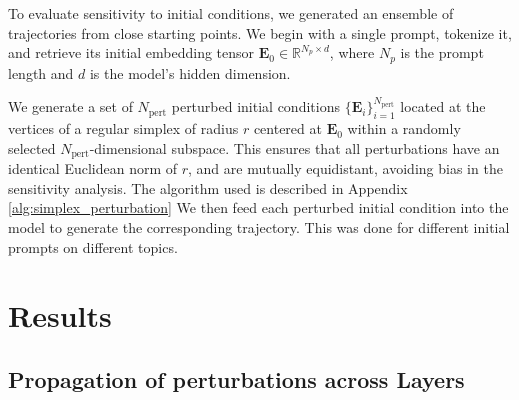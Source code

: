 \documentclass[a4paper,12pt]{article}
\begin{document}
    To evaluate sensitivity to initial conditions, we generated an ensemble of trajectories from close starting points. We begin with a single prompt, tokenize it, and retrieve its initial embedding tensor $\mathbf{E}_0 \in \mathbb{R}^{N_p \times d}$, where $N_p$ is the prompt length and $d$ is the model's hidden dimension. 

    We generate a set of $N_{\text{pert}}$ perturbed initial conditions $\{\mathbf{E}_i\}_{i=1}^{N_{\text{pert}}}$ located at the vertices of a regular simplex of radius $r$ centered at $\mathbf{E}_0$ within a randomly selected $N_{\text{pert}}$-dimensional subspace. This ensures that all perturbations have an identical Euclidean norm of $r$, and are mutually equidistant, avoiding bias in the sensitivity analysis. The algorithm used is described in Appendix \ref{alg:simplex_perturbation}
    We then feed each perturbed initial condition into the model to generate the corresponding trajectory. This was done for different initial prompts on different topics.


    \section{Results}
    \label{sec:results}





    \subsection{Propagation of perturbations across Layers}
    \label{subsec:layer_perturbations}
\end{document}
